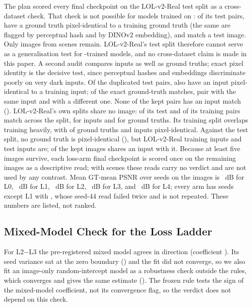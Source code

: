 The plan scored every final checkpoint on the LOL-v2-Real test split \citep{yang2021lolv2}
as a cross-dataset check. That check is not possible for models trained on \dataset: of its
 test pairs,  have a ground truth pixel-identical to a \dataset training
ground truth (the same  are flagged by perceptual hash and by DINOv2 embedding),
and  match a \dataset test image. Only  images from  scenes remain.
LOL-v2-Real's test split therefore cannot serve as a generalisation test for \dataset-trained
models, and no cross-dataset claim is made in this paper. A second audit compares inputs
as well as ground truths; exact pixel identity is the decisive test, since perceptual hashes
and embeddings discriminate poorly on very dark inputs. Of the  duplicated test
pairs,  also have an input pixel-identical to a \dataset training input; of the
exact ground-truth matches,  pair with the same \dataset input and  with a
different one. None of the  kept pairs has an input match (). LOL-v2-Real's
own splits share no image:  of its  test and  of its 
training pairs match across the split, for inputs and for ground truths. Its training split
overlaps \dataset training heavily, with  of  ground truths and
 inputs pixel-identical. Against the \dataset test split, no ground truth is
pixel-identical (), but  LOL-v2-Real training inputs and  test inputs are;
 of the  kept images shares an input with it. Because at least five images
survive, each loss-arm final checkpoint is scored once on the  remaining images as a
descriptive read; with  scenes these reads carry no verdict and are not used by any
contrast. Mean GT-mean PSNR over seeds on the  images is ~dB for L0,
~dB for L1, ~dB for L2, ~dB for L3, and ~dB
for L4; every arm has  seeds except L1 with , whose seed-44 read failed twice
and is not repeated. These numbers are listed, not ranked.

\subsection{Mixed-Model Check for the Loss Ladder}
\label{sec:app-mixed}

For L2$-$L3 the pre-registered mixed model agrees in direction (coefficient ).
Its seed variance sat at the zero boundary () and the fit did not converge, so
we also fit an image-only random-intercept model as a robustness check outside the rules,
which converges and gives the same estimate (). The frozen rule tests the sign
of the mixed-model coefficient, not its convergence flag, so the verdict does not depend on
this check.


